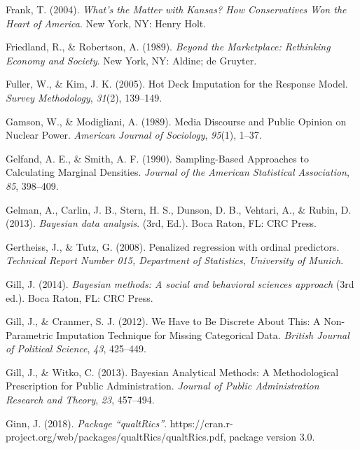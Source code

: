 \documentclass[12pt,econ]{sources/authesis}
\begin{document}
\leavevmode\hypertarget{ref-frank_whats_2004}{}%
Frank, T. (2004). \emph{What's the Matter with Kansas? How Conservatives Won the Heart of America}. New York, NY: Henry Holt.

\leavevmode\hypertarget{ref-friedland_beyond_1989}{}%
Friedland, R., \& Robertson, A. (1989). \emph{Beyond the Marketplace: Rethinking Economy and Society}. New York, NY: Aldine; de Gruyter.

\leavevmode\hypertarget{ref-fuller_2005_deck}{}%
Fuller, W., \& Kim, J. K. (2005). Hot Deck Imputation for the Response Model. \emph{Survey Methodology}, \emph{31}(2), 139--149.

\leavevmode\hypertarget{ref-gamson_media_1989}{}%
Gamson, W., \& Modigliani, A. (1989). Media Discourse and Public Opinion on Nuclear Power. \emph{American Journal of Sociology}, \emph{95}(1), 1--37.

\leavevmode\hypertarget{ref-gelfand_1990_sampling-based}{}%
Gelfand, A. E., \& Smith, A. F. (1990). Sampling-Based Approaches to Calculating Marginal Densities. \emph{Journal of the American Statistical Association}, \emph{85}, 398--409.

\leavevmode\hypertarget{ref-gelman_2013_bayesian}{}%
Gelman, A., Carlin, J. B., Stern, H. S., Dunson, D. B., Vehtari, A., \& Rubin, D. (2013). \emph{Bayesian data analysis}. (3rd, Ed.). Boca Raton, FL: CRC Press.

\leavevmode\hypertarget{ref-gertheiss_2008_penalized}{}%
Gertheiss, J., \& Tutz, G. (2008). Penalized regression with ordinal predictors. \emph{Technical Report Number 015, Department of Statistics, University of Munich}.

\leavevmode\hypertarget{ref-gill_2014_bayesian}{}%
Gill, J. (2014). \emph{Bayesian methods: A social and behavioral sciences approach} (3rd ed.). Boca Raton, FL: CRC Press.

\leavevmode\hypertarget{ref-gill_2012_have}{}%
Gill, J., \& Cranmer, S. J. (2012). We Have to Be Discrete About This: A Non-Parametric Imputation Technique for Missing Categorical Data. \emph{British Journal of Political Science}, \emph{43}, 425--449.

\leavevmode\hypertarget{ref-gill_2013_bayesian}{}%
Gill, J., \& Witko, C. (2013). Bayesian Analytical Methods: A Methodological Prescription for Public Administration. \emph{Journal of Public Administration Research and Theory}, \emph{23}, 457--494.

\leavevmode\hypertarget{ref-ginn_2018_package}{}%
Ginn, J. (2018). \emph{Package ``qualtRics''}. https://cran.r-project.org/web/packages/qualtRics/qualtRics.pdf, package version 3.0.
\end{document}
